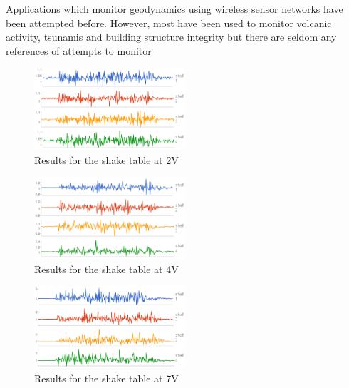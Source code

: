 Applications which monitor geodynamics using wireless sensor networks have been attempted before. However, most have been used to
monitor volcanic activity, tsunamis and building structure integrity but there are seldom any references of attempts to monitor 


\begin{figure}[ht] \centering
  \includegraphics[width=0.5\textwidth]{img/2v.png}
  \caption{Results for the shake table at 2V}
\end{figure}

\begin{figure}[ht] \centering
  \includegraphics[width=0.5\textwidth]{img/4v.png}
  \caption{Results for the shake table at 4V}
\end{figure}

\begin{figure}[ht] \centering
  \includegraphics[width=0.5\textwidth]{img/7v.png}
  \caption{Results for the shake table at 7V}
\end{figure}

